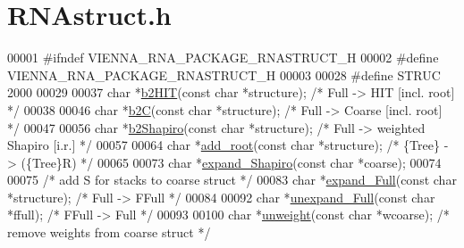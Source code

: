 \hypertarget{RNAstruct_8h_source}{}\section{R\+N\+Astruct.\+h}
\label{RNAstruct_8h_source}

\begin{DoxyCode}
00001 \textcolor{preprocessor}{#ifndef VIENNA\_RNA\_PACKAGE\_RNASTRUCT\_H}
00002 \textcolor{preprocessor}{#define VIENNA\_RNA\_PACKAGE\_RNASTRUCT\_H}
00003 
00028 \textcolor{preprocessor}{#define STRUC     2000}
00029 
00037 \textcolor{keywordtype}{char} *\mbox{\hyperlink{group__struct__utils_ga07b7e90e712559a1992fba3ac6d21bbd}{b2HIT}}(\textcolor{keyword}{const} \textcolor{keywordtype}{char} *structure);             \textcolor{comment}{/* Full   -> HIT    [incl. root] */}
00038 
00046 \textcolor{keywordtype}{char} *\mbox{\hyperlink{group__struct__utils_ga9c80d92391f2833549a8b6dac92233f0}{b2C}}(\textcolor{keyword}{const} \textcolor{keywordtype}{char} *structure);               \textcolor{comment}{/* Full   -> Coarse [incl. root] */}
00047 
00056 \textcolor{keywordtype}{char} *\mbox{\hyperlink{group__struct__utils_ga5cd2feb367feeacad0c03cb7ddba5f10}{b2Shapiro}}(\textcolor{keyword}{const} \textcolor{keywordtype}{char} *structure);         \textcolor{comment}{/* Full -> weighted Shapiro [i.r.] */}
00057 
00064 \textcolor{keywordtype}{char} *\mbox{\hyperlink{group__struct__utils_ga880d33066dd95441e5fbb73c57ed1c3e}{add\_root}}(\textcolor{keyword}{const} \textcolor{keywordtype}{char} *structure);                   \textcolor{comment}{/* \{Tree\} -> (\{Tree\}R)          */}
00065 
00073 \textcolor{keywordtype}{char}  *\mbox{\hyperlink{group__struct__utils_gabe3d815b420dc4553bfb23511198b4c6}{expand\_Shapiro}}(\textcolor{keyword}{const} \textcolor{keywordtype}{char} *coarse);
00074 
00075 \textcolor{comment}{/* add S for stacks to coarse struct */}
00083 \textcolor{keywordtype}{char}  *\mbox{\hyperlink{group__struct__utils_ga78d73cd54a068ef2812812771cdddc6f}{expand\_Full}}(\textcolor{keyword}{const} \textcolor{keywordtype}{char} *structure);      \textcolor{comment}{/* Full   -> FFull         */}
00084 
00092 \textcolor{keywordtype}{char}  *\mbox{\hyperlink{group__struct__utils_ga260c4b622093b76a883bf96628280de1}{unexpand\_Full}}(\textcolor{keyword}{const} \textcolor{keywordtype}{char} *ffull);        \textcolor{comment}{/* FFull  -> Full          */}
00093 
00100 \textcolor{keywordtype}{char}  *\mbox{\hyperlink{group__struct__utils_ga09a80253ac7b6bae606871ba7c6e5136}{unweight}}(\textcolor{keyword}{const} \textcolor{keywordtype}{char} *wcoarse);           \textcolor{comment}{/* remove weights from coarse struct */}

\end{DoxyCode}
